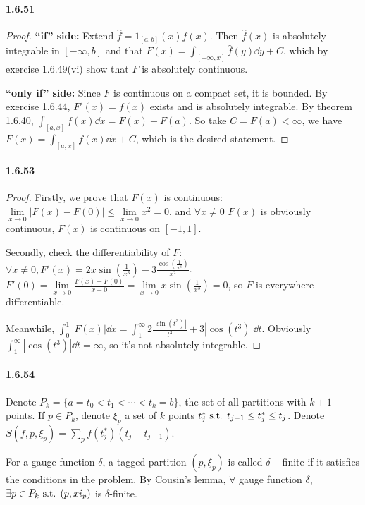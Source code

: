 \documentclass{article}
\begin{document}
\paragraph{1.6.51}
\begin{proof}
\textbf{``if'' side:} Extend $\hat f=1_{[a,b]}(x)f(x)$. Then $\hat f(x)$ is absolutely integrable in $[-\infty,b]$ and that $F(x)=\int_{[-\infty,x]}\hat f(y)\dd y+C$, which by exercise 1.6.49(vi) show that $F$ is absolutely continuous.

\textbf{``only if'' side:} Since $F$ is continuous on a compact set, it is bounded. By exercise 1.6.44, $F'(x)=f(x)$ exists and is absolutely integrable. By theorem 1.6.40, $\int_{[a,x]}f(x)\dd x=F(x)-F(a)$. So take $C=F(a)<\infty$, we have $F(x)=\int_{[a,x]}f(x)\dd x+C$, which is the desired statement.
\end{proof}

\paragraph{1.6.53}
\begin{proof}
Firstly, we prove that $F(x)$ is continuous: $\lim\limits_{x\to 0}|F(x)-F(0)|\leq \lim\limits_{x\to 0}x^2=0$, and $\forall x\neq 0$ $F(x)$ is obviously continuous, $F(x)$ is continuous on $[-1,1]$.

Secondly, check the differentiability of $F$: $\forall x\neq 0, F'(x)=2 x \sin(\frac{1}{x^3}) - 3 \frac{\cos(\frac{1}{x^3})}{x^2}$. $F'(0)=\lim\limits_{x\to 0}\frac{F(x)-F(0)}{x-0}=\lim\limits_{x\to 0}x\sin (\frac{1}{x^3})=0$, so $F$ is everywhere differentiable.

Meanwhile, $\int_0^1 |F(x)|\dd x=\int_1^\infty  2\frac{|\sin(t^3)|}{t^3}+3|\cos(t^3)|\dd t$. Obviously $\int_1^\infty |\cos(t^3)|\dd t=\infty$, so it's not absolutely integrable.
\end{proof}

\newcommand{\HK}{Henstock-Kurzweil }

\paragraph{1.6.54}
Denote $P_k=\{a=t_0<t_1<\cdots<t_k=b\}$, the set of all partitions with $k+1$ points. If $p\in P_k$, denote $\xi_p$ a set of $k$ points $t^*_j\text{ s.t. } t_{j-1}\leq t^*_j\leq t_j$. Denote $S(f,p,\xi_p)=\sum_{p}f(t^*_j)(t_j-t_{j-1})$.

For a gauge function $\delta$, a tagged partition $(p,\xi_p)$ is called $\delta-$finite if it satisfies the conditions in the problem. By Cousin's lemma, $\forall$ gauge function $\delta$, $\exists p\in P_k\text{ s.t. }(p,xi_p)$ is $\delta$-finite.
\end{document}

